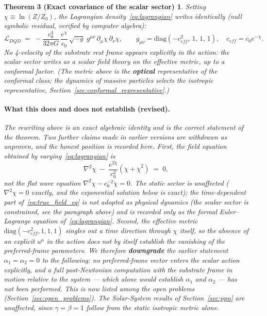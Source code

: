 \documentclass[11pt,a4paper]{article}
\theoremstyle{plain}
\newtheorem*{thmC}{Theorem 3 (Exact covariance of the scalar sector)}
\theoremstyle{remark}
\begin{document}
\begin{thmC}
Setting $\chi \equiv \ln(Z/Z_0)$, the Lagrangian density~\eqref{eq:lagrangian} writes \emph{identically} (null symbolic residual, verified by computer algebra):
\begin{equation}
\mathcal{L}_{DQD} \;=\; -\frac{c_0^4}{32\pi G}\,\frac{e^{\chi}}{c_0}\,\sqrt{-g}\;g^{\mu\nu}\,\partial_\mu \chi\,\partial_\nu \chi ,
\qquad g_{\mu\nu} = \mathrm{diag}\!\left(-c_{eff}^2,\,1,\,1,\,1\right),\quad c_{eff} = c_0 e^{-\chi}.
\end{equation}
No 4-velocity of the substrate rest frame appears explicitly in the action: the scalar sector writes as a scalar field theory on the effective metric, up to a conformal factor. \emph{(The metric above is the \textbf{optical} representative of the conformal class; the dynamics of massive particles selects the isotropic representative, Section~\ref{sec:conformal_representative}.)}

\paragraph{What this does and does not establish (revised).} The rewriting above is an exact algebraic identity and is the correct statement of the theorem. Two further claims made in earlier versions are withdrawn as unproven, and the honest position is recorded here. First, the field equation obtained by varying~\eqref{eq:lagrangian} is
\begin{equation}\label{eq:true_field_eq}
\nabla^2\chi \;-\; \frac{e^{2\chi}}{c_0^{2}}\left(\ddot\chi + \dot\chi^{2}\right) \;=\; 0 ,
\end{equation}
\emph{not} the flat wave equation $\nabla^2\chi - c_0^{-2}\ddot\chi = 0$. The static sector is unaffected ($\nabla^2\chi = 0$ exactly, and the exponential solution below is exact); the time-dependent part of~\eqref{eq:true_field_eq} is not adopted as physical dynamics (the scalar sector is constrained, see the paragraph above) and is recorded only as the formal Euler--Lagrange equation of~\eqref{eq:lagrangian}. Second, the effective metric $\mathrm{diag}(-c_{eff}^2,1,1,1)$ singles out a time direction through $\chi$ itself, so the absence of an explicit $u^\mu$ in the action does not by itself establish the vanishing of the preferred-frame parameters. We therefore \textbf{downgrade} the earlier statement $\alpha_1 = \alpha_2 = 0$ to the following: \emph{no preferred-frame vector enters the scalar action explicitly, and a full post-Newtonian computation with the substrate frame in motion relative to the system --- which alone would establish $\alpha_1$ and $\alpha_2$ --- has not been performed.} This is now listed among the open problems (Section~\ref{sec:open_problems}). The Solar-System results of Section~\ref{sec:ppn} are unaffected, since $\gamma = \beta = 1$ follow from the static isotropic metric alone.
\end{thmC}
\end{document}
